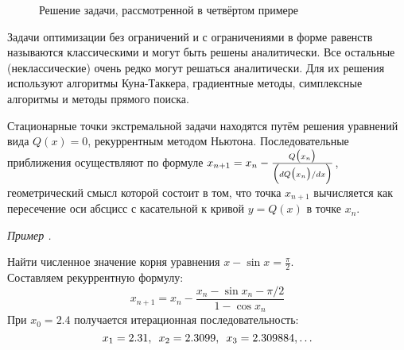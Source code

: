 \documentclass[preprint,russian,a5paper,10pt,twoside,mediummath]{ncc}
\newcommand{\ExampleMy}{\vspace{\baselineskip}\textbf{\underline{Пример:}}\nopagebreak\par}
\newcounter{problem}[section]				%
\renewcommand{\theproblem}{\thesection.\arabic{problem}}		%
\newenvironment{problem}%
	{\par \vspace{\baselineskip} \refstepcounter{problem} {\raggedleft \textit{Пример \theproblem} \par} \vspace{-0.5\baselineskip} \begin{oframed}}%
	{\par \end{oframed}}%
\begin{document}


\begin{figure}[ht] \centering
{}
\footnotesize \caption{Решение задачи, рассмотренной в четвёртом примере\label{fig:extremum:fourth_example}}
\end{figure}

Задачи оптимизации без ограничений и с ограничениями в форме равенств называются классическими и могут быть решены аналитически. Все остальные (неклассические) очень редко могут решаться аналитически. Для их решения используют алгоритмы Куна-Таккера, градиентные методы, симплексные алгоритмы и методы прямого поиска.

Стационарные точки экстремальной задачи находятся путём решения уравнений вида $ Q(x) = 0 $, рекуррентным методом Ньютона. Последовательные приближения осуществляют по формуле $ x_{n+1} = x_n - \frac{ Q \bigl( x_n \bigr) }{ \Bigl(  dQ \bigl( x_n \bigr) / dx \Bigr) } $, геометрический смысл которой состоит в том, что точка $ x_{n+1} $ вычисляется как пересечение оси абсцисс с касательной к кривой $ y = Q(x) $ в точке $ x_n $.


\begin{problem}
Найти численное значение корня уравнения $ x - \sin x = \frac{ \pi }{2} $.\\
Составляем рекуррентную формулу:
\[ x_{n+1} = x_n - \frac{ x_n - \sin x_n - \pi/2}{ 1 - \cos x_n } \]
При ${{x}_{0}}=2.4$ получается итерационная последовательность:
\[ x_1 = 2.31, \enskip x_2 = 2.3099, \enskip x_3 = 2.309884, \ldots \]
\end{problem}
\end{document}
